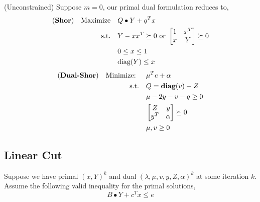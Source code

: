 \documentclass[../main]{subfiles}
\begin{document}
\begin{lemma}
    (Unconstrained) Suppose \(m = 0\), our primal dual formulation reduces to,
    \begin{equation}
        \begin{aligned}
            (\textbf{Shor}) \quad\mathrm{Maximize}\quad & Q\bullet Y   + q^T x                                             \\
            \mathrm{s.t.}  \quad                     & Y-xx^T \succeq 0 \text { or }\begin{bmatrix} 1 & x^{T} \\ x & Y \end{bmatrix} \succeq 0 \\
                                                     & 0\le x\le 1                                                      \\
                                                     & \mathrm{diag}(Y) \le x
        \end{aligned}
    \end{equation}
    \begin{equation}
        \begin{aligned}
            (\textbf{Dual-Shor}) \quad \textrm{Minimize: }\quad & \mu^Te + \alpha                     \\
            \mathrm{s.t.} \quad                              & Q = \mathbf{diag}(v)  -Z                    \\
                                                             & \mu - 2 y - v - q \ge 0             \\
                                                             & \begin{bmatrix}Z & y \\ y^T & \alpha\end{bmatrix} \succeq 0 \\
                                                             & \mu, v \ge 0
        \end{aligned}
    \end{equation}
\end{lemma}


\subsection{Linear Cut}

Suppose we have primal \((x, Y)^{k}\) and dual \((\lambda, \mu, v, y, Z, \alpha)^k\) at some iteration \(k\). Assume the following valid inequality for the primal solutions,
\begin{equation*}
    B\bullet Y + c^T x \le e
\end{equation*}
\end{document}
